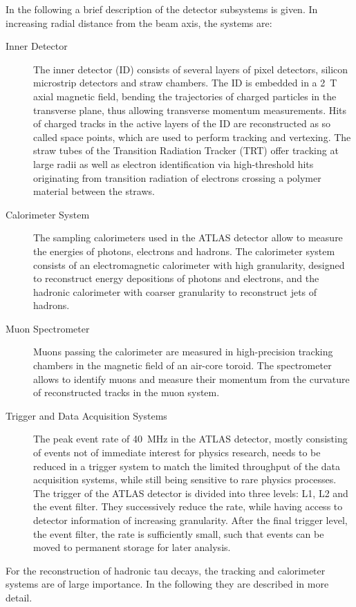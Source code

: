 In the following a brief description of the detector subsystems is given. In
increasing radial distance from the beam axis, the systems are:
\begin{description}
\item[Inner Detector] The inner detector (ID) consists of several layers of
  pixel detectors, silicon microstrip detectors and straw chambers. The ID is
  embedded in a \SI{2}{\tesla} axial magnetic field, bending the trajectories of
  charged particles in the transverse plane, thus allowing transverse momentum
  measurements. Hits of charged tracks in the active layers of the ID are
  reconstructed as so called space points, which are used to perform tracking
  and vertexing. The straw tubes of the Transition Radiation Tracker (TRT) offer
  tracking at large radii as well as electron identification via high-threshold
  hits originating from transition radiation of electrons crossing a polymer
  material between the straws.

\item[Calorimeter System] The sampling calorimeters used in the ATLAS detector
  allow to measure the energies of photons, electrons and hadrons. The
  calorimeter system consists of an electromagnetic calorimeter with high
  granularity, designed to reconstruct energy depositions of photons and
  electrons, and the hadronic calorimeter with coarser granularity to
  reconstruct jets of hadrons.

\item[Muon Spectrometer] Muons passing the calorimeter are measured in
  high-precision tracking chambers in the magnetic field of an air-core toroid.
  The spectrometer allows to identify muons and measure their momentum from the
  curvature of reconstructed tracks in the muon system.

\item[Trigger and Data Acquisition Systems] The peak event rate of
  \SI{40}{\mega\hertz} in the ATLAS detector, mostly consisting of events not of
  immediate interest for physics research, needs to be reduced in a trigger
  system to match the limited throughput of the data acquisition systems, while
  still being sensitive to rare physics processes. The trigger of the ATLAS
  detector is divided into three levels: L1, L2 and the event filter. They
  successively reduce the rate, while having access to detector information of
  increasing granularity. After the final trigger level, the event filter, the
  rate is sufficiently small, such that events can be moved to permanent storage
  for later analysis.
\end{description}
For the reconstruction of hadronic tau decays, the tracking and calorimeter
systems are of large importance. In the following they are described in more
detail.

